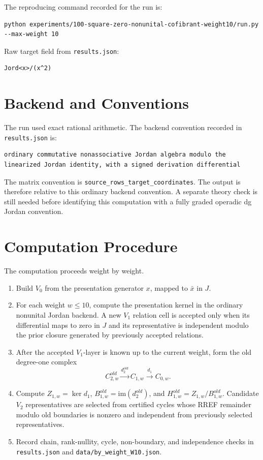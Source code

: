 \documentclass[11pt]{article}
\begin{document}
The reproducing command recorded for the run is:
\begin{lstlisting}
python experiments/100-square-zero-nonunital-cofibrant-weight10/run.py --max-weight 10
\end{lstlisting}

Raw target field from \texttt{results.json}:
\begin{lstlisting}
Jord<x>/(x^2)
\end{lstlisting}

\section*{Backend and Conventions}

The run used exact rational arithmetic.  The backend convention recorded in
\texttt{results.json} is:
\begin{lstlisting}
ordinary commutative nonassociative Jordan algebra modulo the linearized Jordan identity, with a signed derivation differential
\end{lstlisting}

The matrix convention is
\texttt{source\_rows\_target\_coordinates}.  The output is therefore relative
to this ordinary backend convention.  A separate theory check is still needed
before identifying this computation with a fully graded operadic dg Jordan
convention.

\section*{Computation Procedure}

The computation proceeds weight by weight.

\begin{enumerate}
\item Build \(V_0\) from the presentation generator \(x\), mapped to
\(\bar{x}\) in \(J\).
\item For each weight \(w\leq 10\), compute the presentation kernel in the
ordinary nonunital Jordan backend.  A new \(V_1\) relation cell is accepted
only when its differential maps to zero in \(J\) and its representative is
independent modulo the prior closure generated by previously accepted
relations.
\item After the accepted \(V_1\)-layer is known up to the current weight, form
the old degree-one complex
\[
C^{old}_{2,w}\xrightarrow{d^{old}_2}C_{1,w}\xrightarrow{d_1}C_{0,w}.
\]
\item Compute \(Z_{1,w}=\ker d_1\), \(B^{old}_{1,w}=\mathrm{im}(d^{old}_2)\),
and \(H^{old}_{1,w}=Z_{1,w}/B^{old}_{1,w}\).  Candidate \(V_2\)
representatives are selected from certified cycles whose RREF remainder modulo
old boundaries is nonzero and independent from previously selected
representatives.
\item Record chain, rank-nullity, cycle, non-boundary, and independence checks
in \texttt{results.json} and \texttt{data/by\_weight\_W10.json}.
\end{enumerate}
\end{document}
